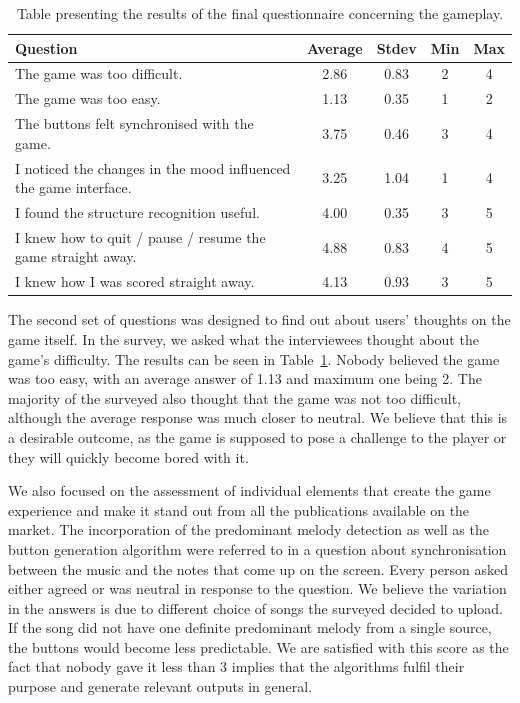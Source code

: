 \begin{table}
\begin{center}
\begin{tabular}{| p{8cm} | c | c | c | c | } 																			   \hline 
 \textbf{Question} & \textbf{Average} & \textbf{Stdev} & \textbf{Min} & \textbf{Max }	\\ \hline \hline
 The game was too difficult. 														& 2.86 & 0.83 & 2 & 4 \\ \hline		
 The game was too easy. 															& 1.13 & 0.35 & 1 & 2  \\ \hline
 The buttons felt synchronised with the game. 								& 3.75 & 0.46 & 3 & 4	 \\ \hline
 I noticed the changes in the mood influenced the game interface.	& 3.25 & 1.04 & 1 & 4	 \\ \hline
 I found the structure recognition useful.										& 4.00 & 0.35 & 3 & 5  \\ \hline
 I knew how to quit / pause / resume the game straight away.			& 4.88 & 0.83 & 4 & 5	 \\ \hline
 I knew how I was scored straight away.										& 4.13 & 0.93 & 3 & 5	 \\ \hline
 \end{tabular}
\caption{Table presenting the results of the final questionnaire concerning the gameplay.}
\label{table:finalquestionsgameplay}
\end{center}
\end{table}

The second set of questions was designed to find out about users' thoughts on the game itself. In the survey, we asked what the interviewees thought about the game's difficulty. The results can be seen in Table~\ref{table:finalquestionsgameplay}. Nobody believed the game was too easy, with an average answer of 1.13 and maximum one being 2. The majority of the surveyed also thought that the game was not too difficult, although the average response was much closer to neutral. We believe that this is a desirable outcome, as the game is supposed to pose a challenge to the player or they will quickly become bored with it. 

We also focused on the assessment of individual elements that create the game experience and make it stand out from all the publications available on the market. The incorporation of the predominant melody detection as well as the button generation algorithm were referred to in a question about synchronisation between the music and the notes that come up on the screen. Every person asked either agreed or was neutral in response to the question. We believe the variation in the answers is due to different choice of songs the surveyed decided to upload. If the song did not have one definite predominant melody from a single source, the buttons would become less predictable. 
We are satisfied with this score as the fact that nobody gave it less than 3 implies that the algorithms fulfil their purpose and generate relevant outputs in general.

